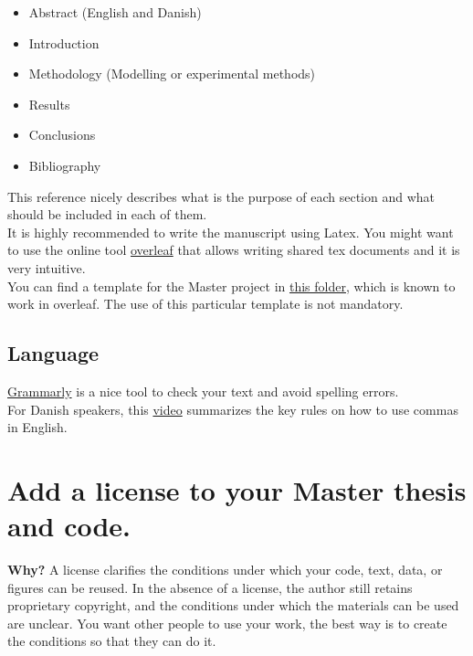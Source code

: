 \documentclass[3p]{elsarticle} %
\begin{document}
\begin{itemize}
\item Abstract (English and Danish)
\item Introduction
\item Methodology (Modelling or experimental methods) 
\item Results
\item Conclusions
\item Bibliography
\end{itemize}

This reference \cite{Socolofsky_2004} nicely describes what is the purpose of each section and what should be included in each of them. \\

It is highly recommended to write the manuscript using Latex. You might want to use the online tool \href{https://es.overleaf.com}{overleaf} that allows writing shared tex documents and it is very intuitive.\\

You can find a template for the Master project in \href{https://github.com/martavp/resources_master/tree/master/LatexTemplate_MasterThesisProject}{this folder}, which is known to work in overleaf. The use of this particular template is not mandatory.

\subsection{Language}

\href{https://app.grammarly.com/}{Grammarly} is a nice tool to check your text and avoid spelling errors. \\

For Danish speakers, this \href{https://www.youtube.com/watch?v=I_i9bvv3N4M}{video} summarizes the key rules on how to use commas in English. 


\section{Add a license to your Master thesis and code.}
 
\textbf{Why?} A license clarifies the conditions under which your code, text, data, or figures can be reused. In the absence of a license, the author still retains proprietary copyright, and the conditions under which the materials can be used are unclear. You want other people to use your work, the best way is to create the conditions so that they can do it. \\
\end{document}
